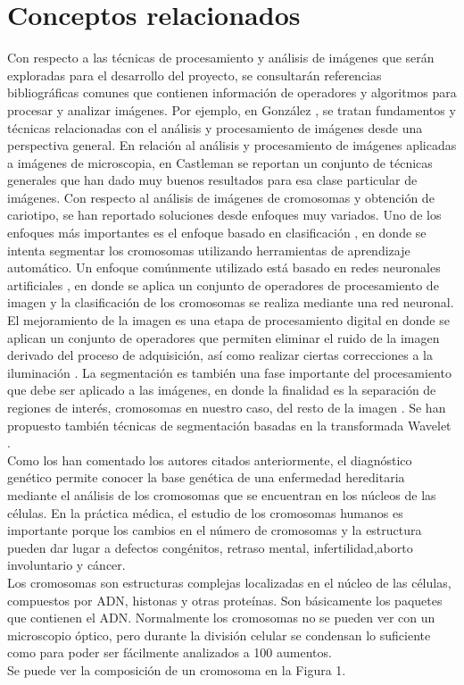 \documentclass[12pt,letterpaper,titlepage]{article}
\begin{document}
\section{Conceptos relacionados}\label{marco}
Con respecto a las técnicas de procesamiento y análisis de imágenes que serán exploradas para el desarrollo del proyecto, se consultarán referencias bibliográficas comunes que contienen información de operadores y algoritmos para procesar y analizar imágenes. Por ejemplo, en  González \cite{1077}, se tratan fundamentos y técnicas relacionadas con el análisis y procesamiento de imágenes desde una perspectiva general. En relación al análisis y procesamiento de imágenes aplicadas a imágenes de microscopia, en Castleman \cite{1022} se reportan un conjunto de técnicas generales que han dado muy buenos resultados para esa clase particular de imágenes. Con respecto al análisis de imágenes de cromosomas y obtención de cariotipo, se han reportado soluciones desde enfoques muy variados. Uno de los enfoques más importantes es el enfoque basado en clasificación \cite{113}, en donde se intenta segmentar los cromosomas utilizando herramientas de aprendizaje automático. Un enfoque comúnmente utilizado está basado en redes neuronales artificiales \cite{104} \cite{111}, en donde se aplica un conjunto de operadores de procesamiento de imagen y la clasificación de los cromosomas se  realiza mediante una red neuronal. El mejoramiento de la imagen es una etapa de procesamiento digital en donde se aplican un conjunto de operadores que permiten eliminar el ruido de la imagen derivado del proceso de adquisición, así como realizar ciertas correcciones a la iluminación \cite{114}. La segmentación es también una fase importante del procesamiento que debe ser aplicado a las imágenes, en donde la finalidad es la separación de regiones de interés, cromosomas en nuestro caso, del resto de la imagen \cite{106} \cite{109} \cite{103} \cite{117} \cite{112}. Se han propuesto también técnicas de segmentación basadas en la transformada Wavelet \cite{116} \cite{115}. \\

Como los han comentado los autores citados anteriormente, el diagnóstico genético permite conocer la base genética de una enfermedad hereditaria mediante el análisis de los cromosomas que se encuentran en los núcleos de las células. En la práctica médica, el estudio de los cromosomas humanos es importante porque los cambios en el número de cromosomas y la estructura pueden dar lugar a defectos congénitos, retraso mental, infertilidad,aborto involuntario y cáncer.\\
Los cromosomas son estructuras complejas localizadas en el núcleo de las células, compuestos por ADN, histonas y otras  proteínas. Son básicamente los paquetes que contienen el ADN. Normalmente los cromosomas no se pueden  ver con un microscopio óptico, pero durante la división celular se condensan lo suficiente como para poder ser fácilmente  analizados a 100 aumentos.\\
Se puede ver la composición de un cromosoma en la Figura 1. \\
\end{document}
